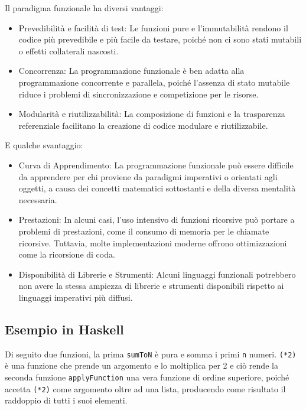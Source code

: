 \documentclass[
  letterpaper,
  DIV=11,
  numbers=noendperiod]{scrreprt}
\providecommand{\tightlist}{%
  \setlength{\itemsep}{0pt}\setlength{\parskip}{0pt}}\usepackage{longtable,booktabs,array}
\begin{document}
Il paradigma funzionale ha diversi vantaggi:

\begin{itemize}
\tightlist
\item
  Prevedibilità e facilità di test: Le funzioni pure e l'immutabilità
  rendono il codice più prevedibile e più facile da testare, poiché non
  ci sono stati mutabili o effetti collaterali nascosti.
\item
  Concorrenza: La programmazione funzionale è ben adatta alla
  programmazione concorrente e parallela, poiché l'assenza di stato
  mutabile riduce i problemi di sincronizzazione e competizione per le
  risorse.
\item
  Modularità e riutilizzabilità: La composizione di funzioni e la
  trasparenza referenziale facilitano la creazione di codice modulare e
  riutilizzabile.
\end{itemize}

E qualche svantaggio:

\begin{itemize}
\tightlist
\item
  Curva di Apprendimento: La programmazione funzionale può essere
  difficile da apprendere per chi proviene da paradigmi imperativi o
  orientati agli oggetti, a causa dei concetti matematici sottostanti e
  della diversa mentalità necessaria.
\item
  Prestazioni: In alcuni casi, l'uso intensivo di funzioni ricorsive può
  portare a problemi di prestazioni, come il consumo di memoria per le
  chiamate ricorsive. Tuttavia, molte implementazioni moderne offrono
  ottimizzazioni come la ricorsione di coda.
\item
  Disponibilità di Librerie e Strumenti: Alcuni linguaggi funzionali
  potrebbero non avere la stessa ampiezza di librerie e strumenti
  disponibili rispetto ai linguaggi imperativi più diffusi.
\end{itemize}

\subsection{Esempio in Haskell}\label{esempio-in-haskell}

Di seguito due funzioni, la prima \texttt{sumToN} è pura e somma i primi
\texttt{n} numeri. \texttt{(*2)} è una funzione che prende un argomento
e lo moltiplica per 2 e ciò rende la seconda funzione
\texttt{applyFunction} una vera funzione di ordine superiore, poiché
accetta \texttt{(*2)} come argomento oltre ad una lista, producendo come
risultato il raddoppio di tutti i suoi elementi.
\end{document}
